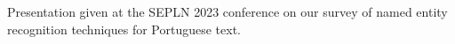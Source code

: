 
Presentation given at the SEPLN 2023 conference on our survey of named entity recognition techniques for Portuguese text.
